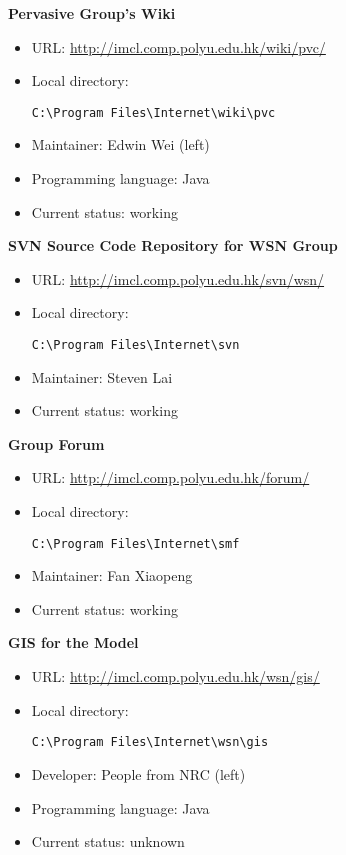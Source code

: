 \textbf{Pervasive Group's Wiki}
\begin{itemize}
\item URL: \url{http://imcl.comp.polyu.edu.hk/wiki/pvc/}
\item Local directory: \begin{verbatim}C:\Program Files\Internet\wiki\pvc\end{verbatim}
\item Maintainer: Edwin Wei (left)
\item Programming language: Java
\item Current status: working
\end{itemize}
\textbf{SVN Source Code Repository for WSN Group}
\begin{itemize}
\item URL: \url{http://imcl.comp.polyu.edu.hk/svn/wsn/}
\item Local directory: \begin{verbatim}C:\Program Files\Internet\svn\end{verbatim}
\item Maintainer: Steven Lai
\item Current status: working
\end{itemize}
\textbf{Group Forum}
\begin{itemize}
\item URL: \url{http://imcl.comp.polyu.edu.hk/forum/}
\item Local directory: \begin{verbatim}C:\Program Files\Internet\smf\end{verbatim}
\item Maintainer: Fan Xiaopeng
\item Current status: working
\end{itemize}
\textbf{GIS for the Model}
\begin{itemize}
\item URL: \url{http://imcl.comp.polyu.edu.hk/wsn/gis/}
\item Local directory: \begin{verbatim}C:\Program Files\Internet\wsn\gis\end{verbatim}
\item Developer: People from NRC (left)
\item Programming language: Java
\item Current status: unknown
\end{itemize}

